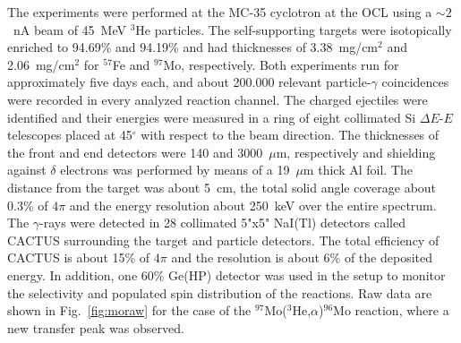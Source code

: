 \begin{multicols}{2}
The experiments were performed at the MC-35 cyclotron at the OCL using a 
$\sim 2$~nA beam of 45~MeV $^3$He particles. The self-supporting targets were 
isotopically enriched to 94.69\% and 94.19\% and had thicknesses of 
3.38~mg/cm$^2$ and 2.06~mg/cm$^2$ for $^{57}$Fe and $^{97}$Mo, respectively. 
Both experiments run for approximately five days each, and about 200.000 
relevant particle-$\gamma$ coincidences were recorded in every analyzed 
reaction channel. The charged ejectiles were identified and their energies were
measured in a ring of eight collimated Si $\Delta E$-$E$ telescopes placed at 
45$^\circ$ with respect to the beam direction. The thicknesses of the front and
end detectors were 140 and 3000~$\mu$m, respectively and shielding against
$\delta$ electrons was performed by means of a 19~$\mu$m thick Al foil. The 
distance from the target was about 5~cm, the total solid angle coverage about 
0.3\% of $4\pi$ and the energy resolution about 250~keV over the entire 
spectrum. The $\gamma$-rays were detected in 28 collimated 5"x5" NaI(Tl) 
detectors called CACTUS \cite{GA90} surrounding the target and particle 
detectors. The total efficiency of CACTUS is about 15\% of $4\pi$ and the 
resolution is about 6\% of the deposited energy. In addition, one 60\% Ge(HP) 
detector was used in the setup to monitor the selectivity and populated spin 
distribution of the reactions. Raw data are shown in Fig.\ \ref{fig:moraw} for 
the case of the $^{97}$Mo($^3$He,$\alpha$)$^{96}$Mo reaction, where a new 
transfer peak was observed.


\end{multicols}
